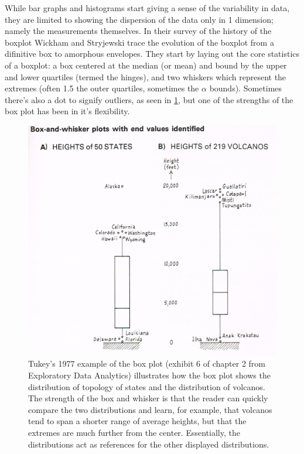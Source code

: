While bar graphs and histograms start giving a sense of the variability in
data, they are limited to showing the dispersion of the data only in 1
dimension; namely the measurements themselves. In their survey of the history
of the boxplot \cite{wickham11} Wickham and Stryjewski trace the evolution of
the boxplot from a difinitive box to amorphous envelopes.  They start by laying out
the core statistics of a boxplot: a box centered at the median (or mean) and
bound by the upper and lower quartiles (termed the hinges), and two whiskers which represent the
extremes (often 1.5 the outer quartiles, sometimes the $\alpha$ bounds). Sometimes there's
also a dot to signify outliers, as seen in \ref{fig:boxplot}, but one of
the strengths of the box plot has been in it's flexibility. 

\begin{figure}
\includegraphics{figs/boxplot.png}
\caption{Tukey's 1977 example of the box plot (exhibit 6 of chapter 2 from
Exploratory Data Analytics\cite{tukey77e}) illustrates how the box plot shows
the distribution of topology of states and
the distribution of volcanos. The strength of the box and whisker is that the
reader can quickly compare the two distributions and learn, for example, that
volcanos tend to span a shorter range of average heights, but that the extremes
are much further from the center. Essentially, the distributions act as
references for the other displayed distributions.}
\label{fig:boxplot}
\end{figure}

